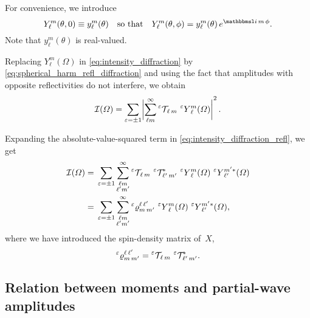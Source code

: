 For convenience, we introduce
\begin{equation}
  \label{eq:small_y_def}
  Y_\ell^m(\theta, 0)
  \equiv y_\ell^m(\theta)
  \quad\text{so that}\quad
  Y_\ell^m(\theta, \phi)
  = y_\ell^m(\theta)\, e^{\imag\, m\, \phi}.
\end{equation}
Note that $y_\ell^m(\theta)$ is real-valued.

Replacing $Y_\ell^m(\Omega)$ in \cref{eq:intensity_diffraction} by
\cref{eq:spherical_harm_refl_diffraction} and using the fact that
amplitudes with opposite reflectivities do not interfere, we obtain
\begin{equation}
  \label{eq:intensity_diffraction_refl}
  \mathcal{I}(\Omega)
  = \sum_{\refl = \pm 1} \Abs[3]{\sum_{\ell m}^\infty \prescript{\refl}{}{\mathcal{T\!}}_{\ell\, m}\, \prescript{\refl}{}{Y}_\ell^m(\Omega)}^2.
\end{equation}

Expanding the absolute-value-squared term in
\cref{eq:intensity_diffraction_refl}, we get
\begin{align}
  \mathcal{I}(\Omega)
  ={}& \sum_{\varepsilon = \pm 1} \sum_{\substack{\ell m \\ \ell' m'}}^\infty
  \prescript{\ensuremath{\varepsilon}}{}{\mathcal{T\!}}_{\ell\, m}\, \prescript{\ensuremath{\varepsilon}}{}{\mathcal{T\!}}_{\ell'\, m'}^*\,
  \prescript{\ensuremath{\varepsilon}}{}{Y}_\ell^m(\Omega)\, \prescript{\ensuremath{\varepsilon}}{}{Y}_{\ell'}^{m' *}(\Omega)
  \\
  \label{eq:intensity_diffraction_refl_spin-dens}
  ={}& \sum_{\varepsilon = \pm 1} \sum_{\substack{\ell m \\ \ell' m'}}^\infty
  \prescript{\ensuremath{\varepsilon}}{}{\varrho}^{\ell\, \ell'}_{m\, m'}\,
  \prescript{\ensuremath{\varepsilon}}{}{Y}_\ell^m(\Omega)\, \prescript{\ensuremath{\varepsilon}}{}{Y}_{\ell'}^{m' *}(\Omega),
\end{align}
where we have introduced the spin-density matrix of~$X$,
\begin{equation}
  \label{eq:diffraction_refl_spin-dens}
  \prescript{\ensuremath{\varepsilon}}{}{\varrho}^{\ell\, \ell'}_{m\, m'}
  = \prescript{\ensuremath{\varepsilon}}{}{\mathcal{T\!}}_{\ell\, m}\, \prescript{\ensuremath{\varepsilon}}{}{\mathcal{T\!}}_{\ell'\, m'}^*.
\end{equation}


\subsection{Relation between moments and partial-wave amplitudes}%
\label{sec:diffraction:moments_pw}


